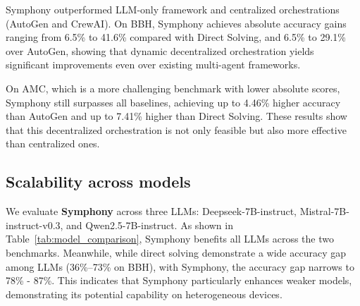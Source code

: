 \documentclass{article}
\begin{document}
Symphony outperformed LLM-only framework and centralized orchestrations (AutoGen and CrewAI). On BBH, Symphony achieves absolute accuracy gains ranging from 6.5\% to 41.6\% compared with Direct Solving, and 6.5\% to 29.1\% over AutoGen, showing that dynamic decentralized orchestration yields significant improvements even over existing multi-agent frameworks. 

On AMC, which is a more challenging benchmark with lower absolute scores, Symphony still surpasses all baselines, achieving up to 4.46\% higher accuracy than AutoGen and up to 7.41\% higher than Direct Solving. These results show that this decentralized orchestration is not only feasible but also more effective than centralized ones.

\subsection{Scalability across models}

We evaluate \textbf{Symphony} across three LLMs: Deepseek-7B-instruct, Mistral-7B-instruct-v0.3, and Qwen2.5-7B-instruct. As shown in Table~\ref{tab:model_comparison}, Symphony benefits all LLMs across the two benchmarks. Meanwhile, while direct solving demonstrate a wide accuracy gap among LLMs (36\%–73\% on BBH), with Symphony, the accuracy gap narrows to 78\% - 87\%. This indicates that Symphony particularly enhances weaker models, demonstrating its potential capability on heterogeneous devices.
\end{document}
